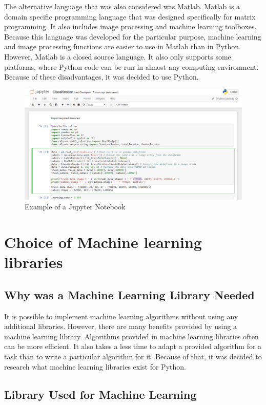 The alternative language that was also considered was Matlab. Matlab is a domain specific programming language that was designed specifically for matrix programming. It also includes image processing and machine learning toolboxes. Because this language was developed for the particular purpose, machine learning and image processing functions are easier to use in Matlab than in Python. However, Matlab is a closed source language. It also only supports some platforms, where Python code can be run in almost any computing environment. Because of these disadvantages, it was decided to use Python.

\begin{figure}[ht]
\centering
\includegraphics[width=14cm]{Figures/c3/c3jupyter.PNG}
\caption{Example of a Jupyter Notebook}
\label{fig:jupyter}
\end{figure}


\section{Choice of Machine learning libraries}

\subsection{Why was a Machine Learning Library Needed}

It is possible to implement machine learning algorithms without using any additional libraries. However, there are many benefits provided by using a  machine learning library. Algorithms provided in machine learning libraries often can be more efficient. It also takes a less time to adapt a provided algorithm for a task than to write a particular algorithm for it. Because of that, it was decided to research what machine learning libraries exist for Python.

\subsection{Library Used for Machine Learning }

